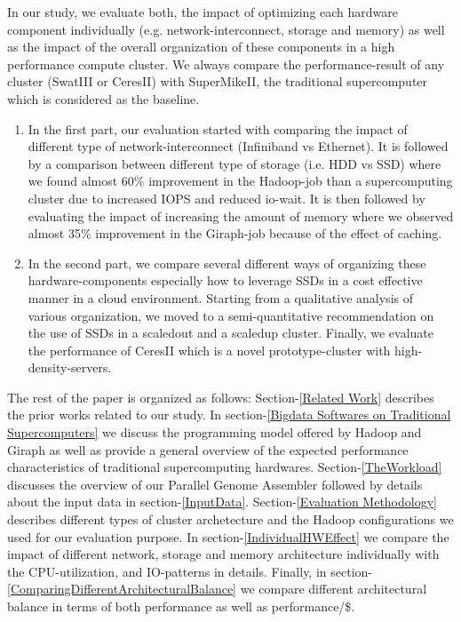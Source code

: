 \documentclass[conference]{IEEEtran}
\begin{document}
In our study, we evaluate both, the impact of optimizing each hardware component individually (e.g. network-interconnect, storage and memory) as well as the impact of the overall organization of these components in a high performance compute cluster.
We always compare the performance-result of any cluster (SwatIII or CeresII) with SuperMikeII, the traditional supercomputer which is considered as the baseline. 
\begin{enumerate}
\item In the first part, our evaluation started with comparing the impact of different type of network-interconnect (Infiniband vs Ethernet). It is followed by a comparison between different type of storage (i.e. HDD vs SSD) where we found almost 60\% improvement in the Hadoop-job than a supercomputing cluster due to increased IOPS and reduced io-wait. It is then followed by evaluating the impact of increasing the amount of memory where we observed almost 35\% improvement in the Giraph-job because of the effect of caching.
\item In the second part, we compare several different ways of organizing these hardware-components especially how to leverage SSDs in a cost effective manner in a cloud environment. Starting from a qualitative analysis of various organization, we moved to a semi-quantitative recommendation on the use of SSDs in a scaledout and a scaledup cluster. Finally, we evaluate the performance of CeresII which is a novel prototype-cluster with high-density-servers. 
\end{enumerate}

The rest of the paper is organized as follows:
Section-\ref{Related Work} describes the prior works related to our study.
In section-\ref{Bigdata Softwares on Traditional Supercomputers} we discuss the programming model offered by Hadoop and Giraph as well as provide a general overview of the expected performance characteristics of traditional supercomputing hardwares.
Section-\ref{TheWorkload} discusses the overview of our Parallel Genome Assembler followed by details about the input data in section-\ref{InputData}.
Section-\ref{Evaluation Methodology} describes different types of cluster archetecture and the Hadoop configurations we used for our evaluation purpose.
In section-\ref{IndividualHWEffect} we compare the impact of different network, storage and memory architecture individually with the CPU-utilization, and IO-patterns in details.
Finally, in section-\ref{ComparingDifferentArchitecturalBalance} we compare different architectural balance in terms of both performance as well as performance/\$.
\end{document}
